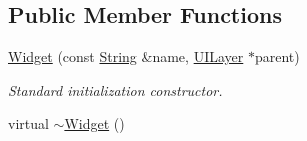 \subsection*{Public Member Functions}
\begin{DoxyCompactItemize}
\item 
\hyperlink{classphys_1_1UI_1_1Widget_a270ffcb858d43bbf94b0ce2089a10607}{Widget} (const \hyperlink{namespacephys_aa03900411993de7fbfec4789bc1d392e}{String} \&name, \hyperlink{classphys_1_1UILayer}{UILayer} $\ast$parent)
\begin{DoxyCompactList}\small\item\em Standard initialization constructor. \item\end{DoxyCompactList}\item 
\hypertarget{classphys_1_1UI_1_1Widget_a95bde61e93544334b376938274617d15}{
virtual \hyperlink{classphys_1_1UI_1_1Widget_a95bde61e93544334b376938274617d15}{$\sim$Widget} ()}
\label{d9/d48/classphys_1_1UI_1_1Widget_a95bde61e93544334b376938274617d15}


\end{DoxyCompactItemize}
